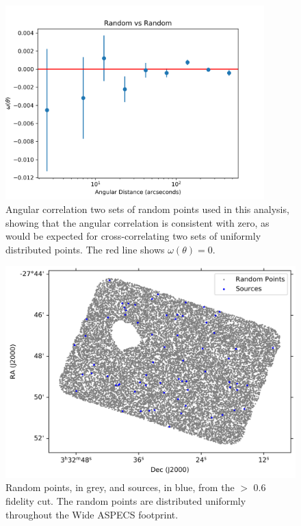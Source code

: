 \begin{figure}[!htbp]
\centering \includegraphics[width=100mm]{clustering/5Random_vs_Random_10000_bin9.png}
\caption{Angular correlation two sets of random points used in this analysis, showing that the angular correlation is consistent with zero, as would be expected for cross-correlating two sets of uniformly distributed points. The red line shows $\omega(\theta) = 0$.}
\label{fig:random_points}
\end{figure}



\begin{figure}[!htbp]
\centering \includegraphics[width=120mm]{PDFS/NX_V_Y_Sources_20000.png}
\caption{Random points, in grey, and sources, in blue, from the $>$ 0.6 fidelity cut. The random points are distributed uniformly throughout the Wide ASPECS footprint.}
\label{fig:Clustering_points}
\end{figure}

